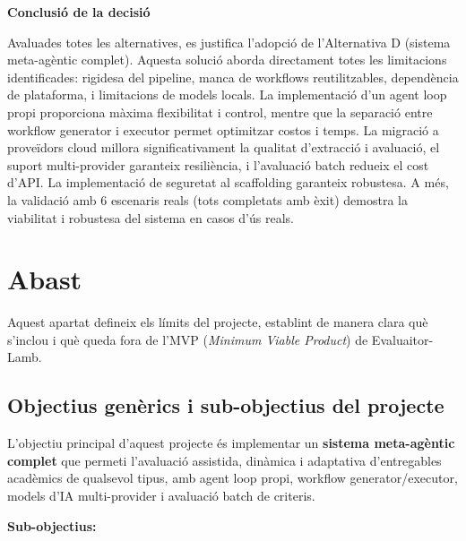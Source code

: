 \documentclass[12pt,a4paper,twoside]{report}
\begin{document}
\textbf{Conclusi\'o de la decisi\'o}

Avaluades totes les alternatives, es justifica l'adopci\'o de l'Alternativa D (sistema meta-ag\`entic complet). Aquesta soluci\'o aborda directament totes les limitacions identificades: rigidesa del pipeline, manca de workflows reutilitzables, depend\`encia de plataforma, i limitacions de models locals. La implementaci\'o d'un agent loop propi proporciona m\`axima flexibilitat i control, mentre que la separaci\'o entre workflow generator i executor permet optimitzar costos i temps. La migraci\'o a prove\"idors cloud millora significativament la qualitat d'extracci\'o i avaluaci\'o, el suport multi-provider garanteix resili\`encia, i l'avaluaci\'o batch redueix el cost d'API. La implementaci\'o de seguretat al scaffolding garanteix robustesa. A m\'es, la validaci\'o amb 6 escenaris reals (tots completats amb \`exit) demostra la viabilitat i robustesa del sistema en casos d'\'us reals.

\chapter{Abast}
\label{chap:abast}

Aquest apartat defineix els l\'imits del projecte, establint de manera clara qu\`e s'inclou i qu\`e queda fora de l'MVP (\textit{Minimum Viable Product}) de Evaluaitor-Lamb.

\section{Objectius gen\`erics i sub-objectius del projecte}
\label{sec:objectius}

L'objectiu principal d'aquest projecte \'es implementar un \textbf{sistema meta-ag\`entic complet} que permeti l'avaluaci\'o assistida, din\`amica i adaptativa d'entregables acad\`emics de qualsevol tipus, amb agent loop propi, workflow generator/executor, models d'IA multi-provider i avaluaci\'o batch de criteris.

\textbf{Sub-objectius:}
\end{document}
